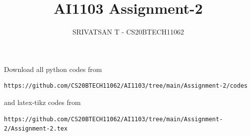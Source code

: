 \documentclass[journal,12pt,twocolumn]{IEEEtran}
\DeclareMathOperator*{\Res}{Res}
\begin{document}
\newcommand{\BEQA}{\begin{eqnarray}}
\newcommand{\EEQA}{\end{eqnarray}}
\newcommand{\define}{\stackrel{\triangle}{=}}

\raggedbottom
\setlength{\parindent}{0pt}
\providecommand{\mbf}{\mathbf}
\providecommand{\pr}[1]{\ensuremath{\Pr\left(#1\right)}}
\providecommand{\qfunc}[1]{\ensuremath{Q\left(#1\right)}}
\providecommand{\sbrak}[1]{\ensuremath{{}\left[#1\right]}}
\providecommand{\lsbrak}[1]{\ensuremath{{}\left[#1\right.}}
\providecommand{\rsbrak}[1]{\ensuremath{{}\left.#1\right]}}
\providecommand{\brak}[1]{\ensuremath{\left(#1\right)}}
\providecommand{\lbrak}[1]{\ensuremath{\left(#1\right.}}
\providecommand{\rbrak}[1]{\ensuremath{\left.#1\right)}}
\providecommand{\cbrak}[1]{\ensuremath{\left\{#1\right\}}}
\providecommand{\lcbrak}[1]{\ensuremath{\left\{#1\right.}}
\providecommand{\rcbrak}[1]{\ensuremath{\left.#1\right\}}}
\theoremstyle{remark}
\newtheorem{rem}{Remark}
\newcommand{\sgn}{\mathop{\mathrm{sgn}}}
\providecommand{\abs}[1]{\vert#1\vert}
\providecommand{\res}[1]{\Res\displaylimits_{#1}} 
\providecommand{\norm}[1]{\lVert#1\rVert}
\providecommand{\mtx}[1]{\mathbf{#1}}
\providecommand{\mean}[1]{E[#1]}
\providecommand{\fourier}{\overset{\mathcal{F}}{ \rightleftharpoons}}
\providecommand{\system}{\overset{\mathcal{H}}{ \longleftrightarrow}}
\newcommand{\solution}{\noindent \textbf{Solution: }}
\newcommand{\cosec}{\,\text{cosec}\,}
\providecommand{\dec}[2]{\ensuremath{\overset{#1}{\underset{#2}{\gtrless}}}}
\newcommand{\myvec}[1]{\ensuremath{\begin{pmatrix}#1\end{pmatrix}}}
\newcommand{\mydet}[1]{\ensuremath{\begin{vmatrix}#1\end{vmatrix}}}
\makeatletter
{}
\makeatother
\let\StandardTheFigure\thefigure
\let\vec\mathbf
\renewcommand{\thefigure}{\theproblem}
\def\putbox#1#2#3{\makebox[0in][l]{\makebox[#1][l]{}\raisebox{\baselineskip}[0in][0in]{\raisebox{#2}[0in][0in]{#3}}}}
     \def\rightbox#1{\makebox[0in][r]{#1}}
     \def\centbox#1{\makebox[0in]{#1}}
     \def\topbox#1{\raisebox{-\baselineskip}[0in][0in]{#1}}
     \def\midbox#1{\raisebox{-0.5\baselineskip}[0in][0in]{#1}}
\vspace{3cm}
\title{AI1103 Assignment-2}
\author{SRIVATSAN T - CS20BTECH11062}
\maketitle
\newpage
\bigskip
\renewcommand{\thefigure}{\theenumi}
\renewcommand{\thetable}{\theenumi}
Download all python codes from 
\begin{lstlisting}
https://github.com/CS20BTECH11062/AI1103/tree/main/Assignment-2/codes
\end{lstlisting}
%
and latex-tikz codes from 
%
\begin{lstlisting}
https://github.com/CS20BTECH11062/AI1103/tree/main/Assignment-2/Assignment-2.tex
\end{lstlisting}
\end{document}
